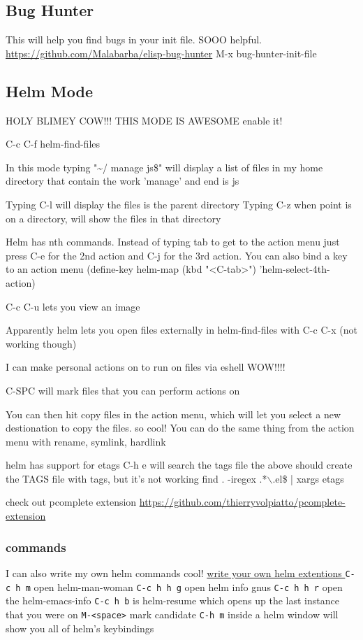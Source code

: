 \documentclass[11pt]{article}
\begin{document}
\subsection{Bug Hunter}
\label{sec:orgheadline18}
 This will help you find bugs in your init file. SOOO helpful.
\url{https://github.com/Malabarba/elisp-bug-hunter}
M-x bug-hunter-init-file
\subsection{Helm Mode}
\label{sec:orgheadline21}
HOLY BLIMEY COW!!! THIS MODE IS AWESOME enable it!

C-c C-f helm-find-files

In this mode typing "\textasciitilde{}/ manage js\$"
will display a list of files in my home directory that contain the work 'manage' and end is js

Typing C-l will display the files is the parent directory
Typing C-z when point is on a directory, will show the files in that directory

Helm has nth commands. Instead of typing tab to get to the action menu
just press C-e for the 2nd action
and C-j for the 3rd action.
You can also bind a key to an action menu
(define-key helm-map (kbd "<C-tab>") 'helm-select-4th-action)

C-c C-u lets you view an image

Apparently helm lets you open files externally in helm-find-files with C-c C-x (not working though)

I can make personal actions on to run on files via eshell WOW!!!!

C-SPC will mark files that you can perform actions on

You can then hit copy files in the action menu, which will let you select a new destionation to copy the files. so cool!
You can do the same thing from the action menu with rename, symlink, hardlink

helm has support for etags
C-h e  will search the tags file
the above should create the TAGS file with tags, but it's not working
find . -iregex .*$\backslash$.el\$ | xargs etags

check out pcomplete extension
\url{https://github.com/thierryvolpiatto/pcomplete-extension}

\subsubsection{commands}
\label{sec:orgheadline19}
I can also write my own helm commands cool!
\href{http://wikemacs.org/wiki/How_to_write_helm_extensions}{write your own helm extentions
}
\texttt{C-c h m}  open helm-man-woman
\texttt{C-c h h g} open helm info gnus
\texttt{C-c h h r} open the helm-emacs-info
\texttt{C-c h b} is helm-resume which opens up the last instance that you were on
\texttt{M-<space>} mark candidate
\texttt{C-h m} inside a helm window will show you all of helm's keybindings
\end{document}
